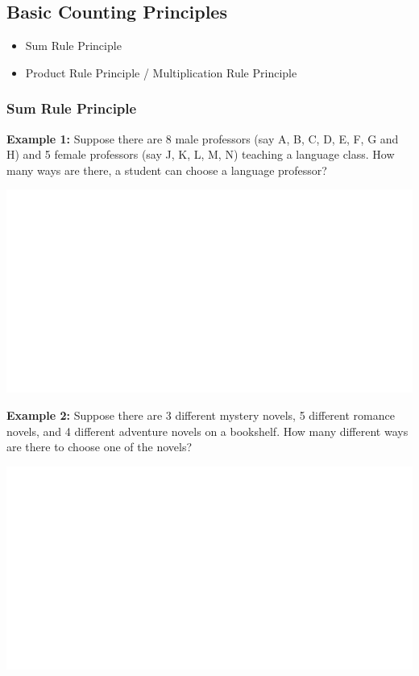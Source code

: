 \documentclass[]{book}
\providecommand{\tightlist}{%
  \setlength{\itemsep}{0pt}\setlength{\parskip}{0pt}}
\begin{document}
\hypertarget{basic-counting-principles}{%
\subsection{Basic Counting Principles}\label{basic-counting-principles}}

\begin{itemize}
\tightlist
\item
  Sum Rule Principle
\item
  Product Rule Principle / Multiplication Rule Principle
\end{itemize}

\hypertarget{sum-rule-principle}{%
\subsubsection{Sum Rule Principle}\label{sum-rule-principle}}

\textbf{Example 1:} Suppose there are 8 male professors (say A, B, C, D, E, F, G and H) and 5 female professors (say J, K, L, M, N) teaching a language class. How many ways are there, a student can choose a language professor?

\begin{center}\includegraphics[width=1\linewidth]{figure/box81-1} \end{center}

\textbf{Example 2:} Suppose there are 3 different mystery novels, 5 different romance novels, and 4 different adventure novels on a bookshelf. How many different ways are there to choose one of the novels?

\begin{center}\includegraphics[width=1\linewidth]{figure/box82-1} \end{center}
\end{document}
